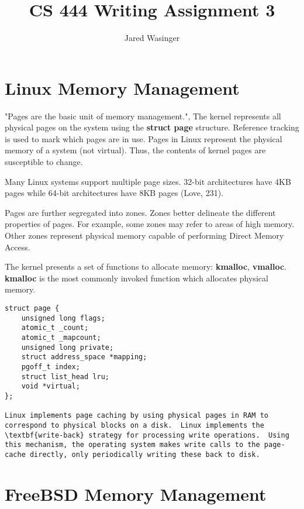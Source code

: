 \documentclass[onecolumn,10pt]{IEEETran}
\title{CS 444 Writing Assignment 3}
\author{Jared Wasinger}
\begin{document}
\maketitle

\section{Linux Memory Management}

"Pages are the basic unit of memory management.",
The kernel represents all physical pages on the system using the \textbf{struct page} structure.
Reference tracking is used to mark which pages are in use.  Pages in Linux represent the physical memory of a system (not virtual).  Thus, the contents of kernel pages are susceptible to change.

Many Linux systems support multiple page sizes.  32-bit architectures have 4KB pages while 64-bit architectures have 8KB pages (Love, 231).

Pages are further segregated into zones.  Zones better delineate the different properties of pages.  For example, some zones may refer to areas of high memory.  Other zones represent physical memory capable of performing Direct Memory Access.

The kernel presents a set of functions to allocate memory: \textbf{kmalloc}, \textbf{vmalloc}. \textbf{kmalloc} is the most commonly invoked function which allocates physical memory.

\begin{lstlisting}
struct page {
	unsigned long flags;
	atomic_t _count;
	atomic_t _mapcount;
	unsigned long private;
	struct address_space *mapping;
	pgoff_t index;
	struct list_head lru;
	void *virtual;
};

Linux implements page caching by using physical pages in RAM to correspond to physical blocks on a disk.  Linux implements the \textbf{write-back} strategy for processing write operations.  Using this mechanism, the operating system makes write calls to the page-cache directly, only periodically writing these back to disk.
\end{lstlisting}

\section{FreeBSD Memory Management}
\end{document}
